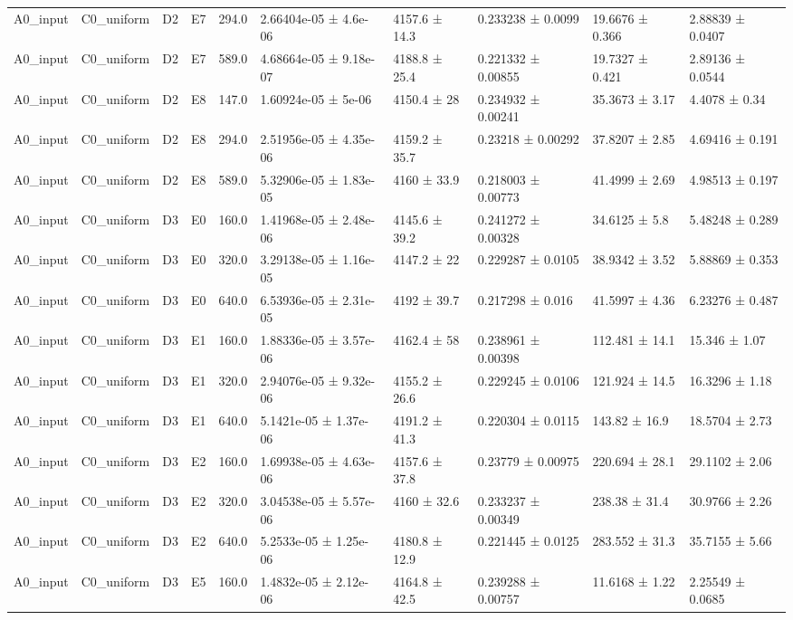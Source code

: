 \begin{table}
\begin{tabular}{llllllllll}
A0\_input & C0\_uniform & D2 & E7 & 294.0 & 2.66404e-05 ± 4.6e-06 & 4157.6 ± 14.3 & 0.233238 ± 0.0099 & 19.6676 ± 0.366 & 2.88839 ± 0.0407 \\
A0\_input & C0\_uniform & D2 & E7 & 589.0 & 4.68664e-05 ± 9.18e-07 & 4188.8 ± 25.4 & 0.221332 ± 0.00855 & 19.7327 ± 0.421 & 2.89136 ± 0.0544 \\
A0\_input & C0\_uniform & D2 & E8 & 147.0 & 1.60924e-05 ± 5e-06 & 4150.4 ± 28 & 0.234932 ± 0.00241 & 35.3673 ± 3.17 & 4.4078 ± 0.34 \\
A0\_input & C0\_uniform & D2 & E8 & 294.0 & 2.51956e-05 ± 4.35e-06 & 4159.2 ± 35.7 & 0.23218 ± 0.00292 & 37.8207 ± 2.85 & 4.69416 ± 0.191 \\
A0\_input & C0\_uniform & D2 & E8 & 589.0 & 5.32906e-05 ± 1.83e-05 & 4160 ± 33.9 & 0.218003 ± 0.00773 & 41.4999 ± 2.69 & 4.98513 ± 0.197 \\
A0\_input & C0\_uniform & D3 & E0 & 160.0 & 1.41968e-05 ± 2.48e-06 & 4145.6 ± 39.2 & 0.241272 ± 0.00328 & 34.6125 ± 5.8 & 5.48248 ± 0.289 \\
A0\_input & C0\_uniform & D3 & E0 & 320.0 & 3.29138e-05 ± 1.16e-05 & 4147.2 ± 22 & 0.229287 ± 0.0105 & 38.9342 ± 3.52 & 5.88869 ± 0.353 \\
A0\_input & C0\_uniform & D3 & E0 & 640.0 & 6.53936e-05 ± 2.31e-05 & 4192 ± 39.7 & 0.217298 ± 0.016 & 41.5997 ± 4.36 & 6.23276 ± 0.487 \\
A0\_input & C0\_uniform & D3 & E1 & 160.0 & 1.88336e-05 ± 3.57e-06 & 4162.4 ± 58 & 0.238961 ± 0.00398 & 112.481 ± 14.1 & 15.346 ± 1.07 \\
A0\_input & C0\_uniform & D3 & E1 & 320.0 & 2.94076e-05 ± 9.32e-06 & 4155.2 ± 26.6 & 0.229245 ± 0.0106 & 121.924 ± 14.5 & 16.3296 ± 1.18 \\
A0\_input & C0\_uniform & D3 & E1 & 640.0 & 5.1421e-05 ± 1.37e-06 & 4191.2 ± 41.3 & 0.220304 ± 0.0115 & 143.82 ± 16.9 & 18.5704 ± 2.73 \\
A0\_input & C0\_uniform & D3 & E2 & 160.0 & 1.69938e-05 ± 4.63e-06 & 4157.6 ± 37.8 & 0.23779 ± 0.00975 & 220.694 ± 28.1 & 29.1102 ± 2.06 \\
A0\_input & C0\_uniform & D3 & E2 & 320.0 & 3.04538e-05 ± 5.57e-06 & 4160 ± 32.6 & 0.233237 ± 0.00349 & 238.38 ± 31.4 & 30.9766 ± 2.26 \\
A0\_input & C0\_uniform & D3 & E2 & 640.0 & 5.2533e-05 ± 1.25e-06 & 4180.8 ± 12.9 & 0.221445 ± 0.0125 & 283.552 ± 31.3 & 35.7155 ± 5.66 \\
A0\_input & C0\_uniform & D3 & E5 & 160.0 & 1.4832e-05 ± 2.12e-06 & 4164.8 ± 42.5 & 0.239288 ± 0.00757 & 11.6168 ± 1.22 & 2.25549 ± 0.0685 \\

\end{tabular}
\end{table}
